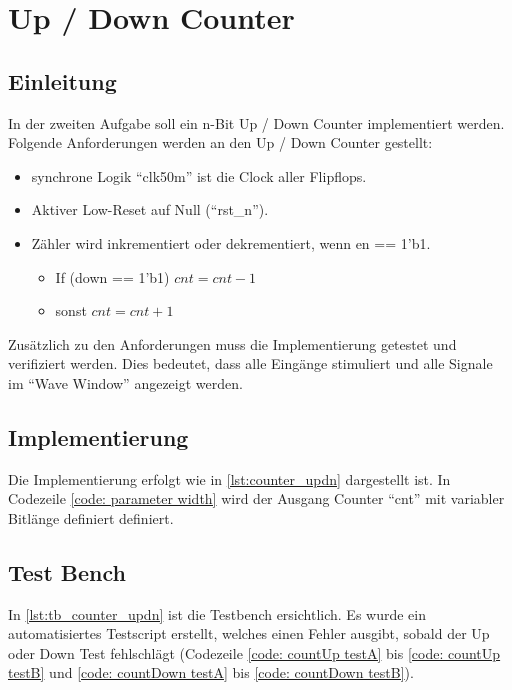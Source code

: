 \documentclass[./\jobname.tex]{subfiles}
\begin{document}
%
\chapter{Up / Down Counter}
%
\section{Einleitung}
%
In der zweiten Aufgabe soll ein n-Bit Up / Down Counter implementiert werden. Folgende Anforderungen werden an den Up / Down Counter gestellt:
%
\begin{itemize}
	\item synchrone Logik \pfeil \enquote{clk50m} ist die Clock aller Flipflops.
	\item Aktiver Low-Reset auf Null (\enquote{rst\_n}).
	\item Zähler wird inkrementiert oder dekrementiert, wenn en == 1'b1.
	\begin{itemize}
		\item If (down == 1'b1) \pfeil\( cnt = cnt-1\)
		\item sonst \pfeil \(cnt = cnt + 1\)
	\end{itemize}
\end{itemize}
%
Zusätzlich zu den Anforderungen muss die Implementierung getestet und verifiziert werden. Dies bedeutet, dass alle Eingänge stimuliert und alle Signale im \enquote{Wave Window} angezeigt werden.
%
\section{Implementierung}
%
Die Implementierung erfolgt wie in \autoref{lst:counter_updn} dargestellt ist. In Codezeile \cref{code: parameter width} wird der Ausgang Counter \enquote{cnt} mit variabler Bitlänge definiert definiert.
%

%
\section{Test Bench}
%
In \autoref{lst:tb_counter_updn} ist die Testbench ersichtlich. Es wurde ein automatisiertes Testscript erstellt, welches einen Fehler ausgibt, sobald der Up oder Down Test fehlschlägt (Codezeile \ref{code: countUp testA} bis \ref{code: countUp testB} und \ref{code: countDown testA} bis \ref{code: countDown testB}). 
%

%
\end{document}
